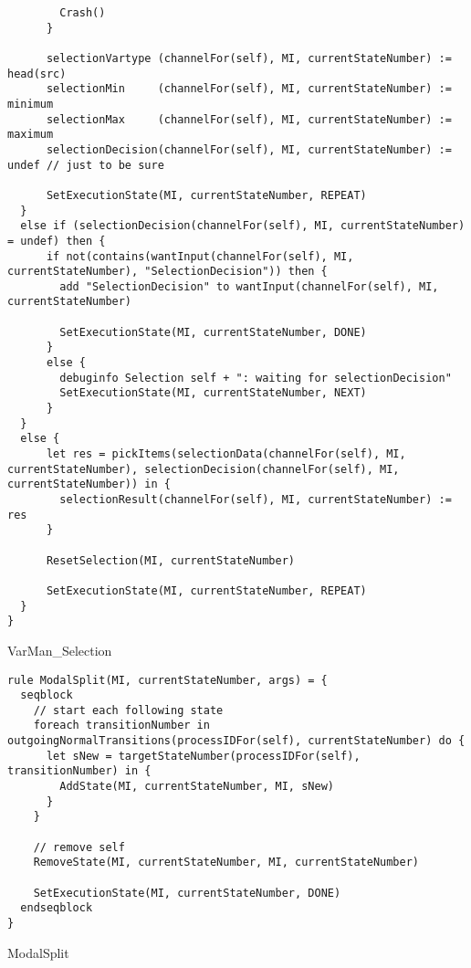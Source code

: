 \begin{listing}[H]
\begin{verbatim}
        Crash()
      }

      selectionVartype (channelFor(self), MI, currentStateNumber) := head(src)
      selectionMin     (channelFor(self), MI, currentStateNumber) := minimum
      selectionMax     (channelFor(self), MI, currentStateNumber) := maximum
      selectionDecision(channelFor(self), MI, currentStateNumber) := undef // just to be sure

      SetExecutionState(MI, currentStateNumber, REPEAT)
  }
  else if (selectionDecision(channelFor(self), MI, currentStateNumber) = undef) then {
      if not(contains(wantInput(channelFor(self), MI, currentStateNumber), "SelectionDecision")) then {
        add "SelectionDecision" to wantInput(channelFor(self), MI, currentStateNumber)

        SetExecutionState(MI, currentStateNumber, DONE)
      }
      else {
        debuginfo Selection self + ": waiting for selectionDecision"
        SetExecutionState(MI, currentStateNumber, NEXT)
      }
  }
  else {
      let res = pickItems(selectionData(channelFor(self), MI, currentStateNumber), selectionDecision(channelFor(self), MI, currentStateNumber)) in {
        selectionResult(channelFor(self), MI, currentStateNumber) := res
      }

      ResetSelection(MI, currentStateNumber)

      SetExecutionState(MI, currentStateNumber, REPEAT)
  }
}
\end{verbatim}
\caption{VarMan_Selection}
\label{lst:asm:VarMan_Selection}
\end{listing}




\begin{listing}[H]
\begin{verbatim}
rule ModalSplit(MI, currentStateNumber, args) = {
  seqblock
    // start each following state
    foreach transitionNumber in outgoingNormalTransitions(processIDFor(self), currentStateNumber) do {
      let sNew = targetStateNumber(processIDFor(self), transitionNumber) in {
        AddState(MI, currentStateNumber, MI, sNew)
      }
    }

    // remove self
    RemoveState(MI, currentStateNumber, MI, currentStateNumber)

    SetExecutionState(MI, currentStateNumber, DONE)
  endseqblock
}
\end{verbatim}
\caption{ModalSplit}
\label{lst:asm:ModalSplit}
\end{listing}




